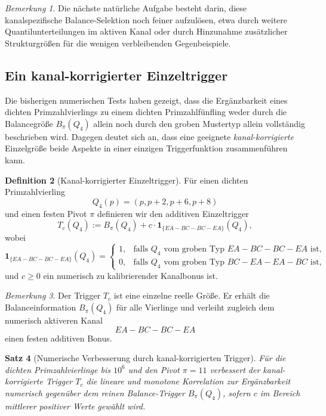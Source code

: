 \documentclass[11pt,a4paper]{article}
\newtheorem{satz}{Satz}
\theoremstyle{definition}
\newtheorem{definition}[satz]{Definition}
\theoremstyle{remark}
\newtheorem{bemerkung}[satz]{Bemerkung}
\begin{document}
	\begin{bemerkung}
		Die nächste natürliche Aufgabe besteht darin, diese kanalspezifische Balance-Selektion
		noch feiner aufzulösen, etwa durch weitere Quantilunterteilungen im aktiven Kanal oder
		durch Hinzunahme zusätzlicher Strukturgrößen für die wenigen verbleibenden
		Gegenbeispiele.
	\end{bemerkung}
	
	\subsection{Ein kanal-korrigierter Einzeltrigger}
	
	Die bisherigen numerischen Tests haben gezeigt, dass die Ergänzbarkeit eines dichten
	Primzahlvierlings zu einem dichten Primzahlfünfling weder durch die Balancegröße
	\(B_\pi(Q_4)\) allein noch durch den groben Mustertyp allein vollständig beschrieben wird.
	Dagegen deutet sich an, dass eine geeignete \emph{kanal-korrigierte} Einzelgröße beide
	Aspekte in einer einzigen Triggerfunktion zusammenführen kann.
	
	\begin{definition}[Kanal-korrigierter Einzeltrigger]
		\label{def:kanal_korrigierter_trigger}
		Für einen dichten Primzahlvierling
		\[
		Q_4(p)=(p,p+2,p+6,p+8)
		\]
		und einen festen Pivot \(\pi\) definieren wir den additiven Einzeltrigger
		\[
		\boxed{
			T_c(Q_4):=B_\pi(Q_4)+c\cdot \mathbf 1_{\{EA-BC-BC-EA\}}(Q_4),
		}
		\]
		wobei
		\[
		\mathbf 1_{\{EA-BC-BC-EA\}}(Q_4)=
		\begin{cases}
			1,& \text{falls }Q_4\text{ vom groben Typ }EA-BC-BC-EA\text{ ist},\\
			0,& \text{falls }Q_4\text{ vom groben Typ }BC-EA-EA-BC\text{ ist},
		\end{cases}
		\]
		und \(c\ge 0\) ein numerisch zu kalibrierender Kanalbonus ist.
	\end{definition}
	
	\begin{bemerkung}
		Der Trigger \(T_c\) ist eine einzelne reelle Größe. Er erhält die Balanceinformation
		\(B_\pi(Q_4)\) für alle Vierlinge und verleiht zugleich dem numerisch aktiveren Kanal
		\[
		EA-BC-BC-EA
		\]
		einen festen additiven Bonus.
	\end{bemerkung}
	
	\begin{satz}[Numerische Verbesserung durch kanal-korrigierten Trigger]
		\label{satz:kanaltrigger_numerisch}
		Für die dichten Primzahlvierlinge bis \(10^6\) und den Pivot \(\pi=11\) verbessert der
		kanal-korrigierte Trigger \(T_c\) die lineare und monotone Korrelation zur Ergänzbarkeit
		numerisch gegenüber dem reinen Balance-Trigger \(B_\pi(Q_4)\), sofern \(c\) im Bereich
		mittlerer positiver Werte gewählt wird.
	\end{satz}
	
\end{document}
